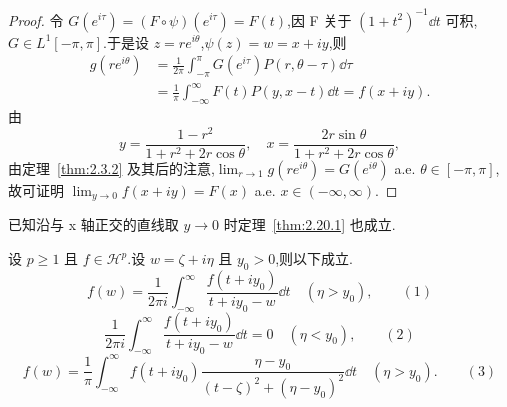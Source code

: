 \begin{proof}
令 $G(e^{i\tau}) = (F \circ \psi)(e^{i\tau}) = F(t)$,因 F 关于 $(1 + t^{2})^{-1}\dd t$ 可积,$G \in L^{1}[-\pi, \pi]$.于是设 $z = re^{i\theta}$,$\psi(z) = w = x + iy$,则
\begin{align*}
g(re^{i\theta}) & = \frac{1}{2\pi}\int_{-\pi}^{\pi} G(e^{i\tau})P(r, \theta - \tau)\dd \tau \\
& = \frac{1}{\pi}\int_{-\infty}^{\infty} F(t)P(y, x - t)\dd t = f(x + iy).
\end{align*}
由
\begin{equation*}
y = \frac{1 - r^{2}}{1 + r^{2} + 2r\cos\theta}, \quad x = \frac{2r\sin\theta}{1 + r^{2} + 2r\cos\theta},
\end{equation*}
由定理~\ref{thm:2.3.2} 及其后的注意,$\lim_{r \to 1} g(re^{i\theta}) = G(e^{i\theta})$ a.e. $\theta \in [-\pi, \pi]$,故可证明 $\lim_{y \to 0}f(x + iy) = F(x)$ a.e. $x \in (-\infty, \infty)$.
\end{proof}

已知沿与 x 轴正交的直线取 $y \to 0$ 时定理~\ref{thm:2.20.1} 也成立.

\begin{lemma}\label{lem:2.20.2}
设 $p \geq 1$ 且 $f \in \mathcal{H}^{p}$.设 $w = \zeta + i\eta$ 且 $y_{0} > 0$,则以下成立.
\begin{equation*}
f(w) = \frac{1}{2\pi i}\int_{-\infty}^{\infty}\frac{f(t + iy_{0})}{t + iy_{0} - w}\dd t \quad (\eta > y_{0}), \qquad (1)
\end{equation*}
\begin{equation*}
\frac{1}{2\pi i}\int_{-\infty}^{\infty}\frac{f(t + iy_{0})}{t + iy_{0} - w}\dd t = 0 \quad (\eta < y_{0}), \qquad (2)
\end{equation*}
\begin{equation*}
f(w) = \frac{1}{\pi}\int_{-\infty}^{\infty} f(t + iy_{0})\frac{\eta - y_{0}}{(t - \zeta)^{2} + (\eta - y_{0})^{2}}\dd t \quad (\eta > y_{0}). \qquad (3)
\end{equation*}
\end{lemma}

